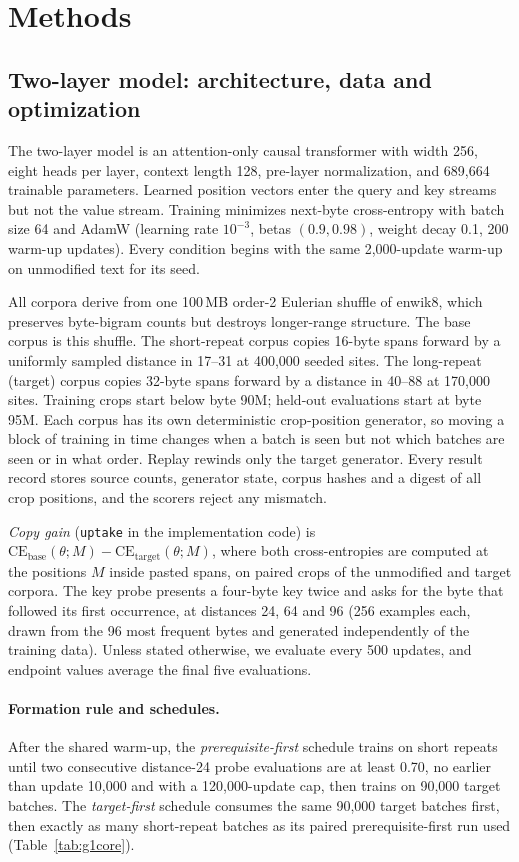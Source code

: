 \section{Methods}
\label{app:methods}

\subsection{Two-layer model: architecture, data and optimization}
The two-layer model is an attention-only causal transformer with width
256, eight heads per layer, context length 128, pre-layer normalization, and
689,664 trainable parameters. Learned position vectors enter the query and key
streams but not the value stream. Training minimizes next-byte cross-entropy with
batch size 64 and AdamW (learning rate $10^{-3}$, betas $(0.9,0.98)$, weight decay
0.1, 200 warm-up updates). Every condition begins with the same 2,000-update
warm-up on unmodified text for its seed.

All corpora derive from one 100\,MB order-2 Eulerian shuffle of enwik8, which
preserves byte-bigram counts but destroys longer-range structure. The base corpus
is this shuffle. The short-repeat corpus copies 16-byte spans forward by a
uniformly sampled distance in 17--31 at 400,000 seeded sites. The long-repeat
(target) corpus copies 32-byte spans forward by a distance in 40--88 at 170,000
sites. Training crops start below byte 90M; held-out evaluations start at byte
95M. Each corpus has its own deterministic crop-position generator, so moving a
block of training in time changes when a batch is seen but not which batches are
seen or in what order. Replay rewinds only the target generator. Every
result record stores source counts, generator state, corpus hashes and a digest
of all crop positions, and the scorers reject any mismatch.

\emph{Copy gain} (\texttt{uptake} in the implementation code) is
$\mathrm{CE}_{\text{base}}(\theta;M)-\mathrm{CE}_{\text{target}}(\theta;M)$, where both
cross-entropies are computed at the positions $M$ inside pasted spans, on paired
crops of the unmodified and target corpora. The key probe presents a four-byte key
twice and asks for the byte that followed its first occurrence, at distances 24,
64 and 96 (256 examples each, drawn from the 96 most frequent bytes and generated
independently of the training data). Unless stated otherwise, we evaluate every
500 updates, and endpoint values average the final five evaluations.

\paragraph{Formation rule and schedules.}
After the shared warm-up, the \emph{prerequisite-first} schedule trains on short
repeats until two consecutive distance-24 probe evaluations are at least 0.70, no
earlier than update 10,000 and with a 120,000-update cap, then trains on 90,000
target batches. The \emph{target-first} schedule consumes the same 90,000 target
batches first, then exactly as many short-repeat batches as its paired
prerequisite-first run used (Table~\ref{tab:g1core}).

